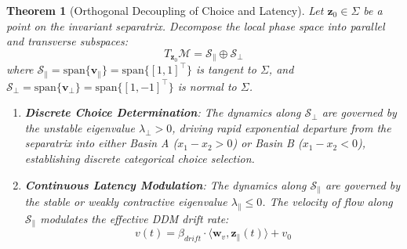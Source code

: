 \documentclass[11pt,a4paper]{article}
\newtheorem{theorem}{Theorem}
\begin{document}
\begin{theorem}[Orthogonal Decoupling of Choice and Latency]
Let $\mathbf{z}_0 \in \Sigma$ be a point on the invariant separatrix. Decompose the local phase space into parallel and transverse subspaces:
\begin{equation}
T_{\mathbf{z}_0}\mathcal{M} = \mathcal{S}_\parallel \oplus \mathcal{S}_\perp
\end{equation}
where $\mathcal{S}_\parallel = \text{span}\{\mathbf{v}_\parallel\} = \text{span}\{[1, 1]^\top\}$ is tangent to $\Sigma$, and $\mathcal{S}_\perp = \text{span}\{\mathbf{v}_\perp\} = \text{span}\{[1, -1]^\top\}$ is normal to $\Sigma$.
\begin{enumerate}
    \item \textbf{Discrete Choice Determination}: The dynamics along $\mathcal{S}_\perp$ are governed by the unstable eigenvalue $\lambda_\perp > 0$, driving rapid exponential departure from the separatrix into either Basin A ($x_1 - x_2 > 0$) or Basin B ($x_1 - x_2 < 0$), establishing discrete categorical choice selection.
    \item \textbf{Continuous Latency Modulation}: The dynamics along $\mathcal{S}_\parallel$ are governed by the stable or weakly contractive eigenvalue $\lambda_\parallel \le 0$. The velocity of flow along $\mathcal{S}_\parallel$ modulates the effective DDM drift rate:
    \begin{equation}
    v(t) = \beta_{drift} \cdot \langle \mathbf{w}_v, \mathbf{z}_\parallel(t) \rangle + v_0
    \end{equation}
\end{enumerate}
\end{theorem}
\end{document}
